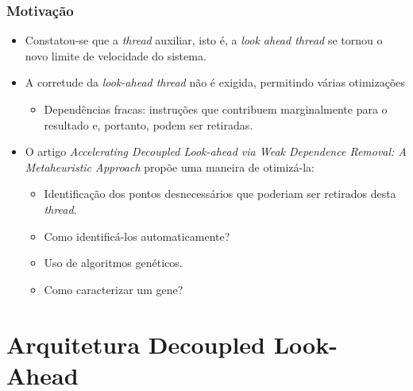 \documentclass[10pt]{beamer}
\begin{document}
\begin{frame}
\frametitle{Motivação}

\begin{itemize}
\item Constatou-se que a \textit{thread} auxiliar, isto é, a \textit{look ahead
thread} se tornou o novo limite de velocidade do sistema.

\item A corretude da \textit{look-ahead thread} não é exigida, permitindo várias
otimizações

\begin{itemize} 
	\item Dependências fracas: instruções que contribuem marginalmente para o
	resultado e, portanto, podem ser retiradas.
	
\end{itemize} 

\item O artigo \textit{Accelerating Decoupled
Look-ahead via Weak Dependence Removal: A Metaheuristic Approach} propõe uma
maneira de otimizá-la:
 
\begin{itemize} 
	\item Identificação dos pontos desnecessários que poderiam ser retirados desta
	\textit{thread}. 
	
	\item Como identificá-los automaticamente?
	 
	\item Uso de algoritmos genéticos.
  
  	\item Como caracterizar um gene? 
	
\end{itemize} 
\end{itemize}

\end{frame}

\section{Arquitetura Decoupled Look-Ahead}
\end{document}
